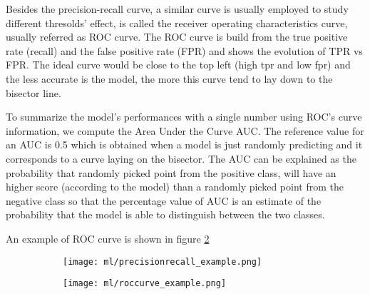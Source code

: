 \documentclass[a4paper,11pt]{article}
\begin{document}
Besides the precision-recall curve, a similar curve is usually employed to study different thresolds' effect, is called the receiver operating characteristics curve, usually referred as ROC curve.
The ROC curve is build from the true positive rate (recall) and the false positive rate (FPR) and shows the evolution of TPR vs FPR.
The ideal curve would be close to the top left (high tpr and low fpr) and the less accurate is the model, the more this curve tend to lay down to the bisector line.

To summarize the model's performances with a single number using ROC's curve information, we compute the Area Under the Curve AUC.
The reference value for an AUC is 0.5 which is obtained when a model is just randomly predicting and it corresponds to a curve laying on the bisector.
The AUC can be explained as the probability that randomly picked point from the positive class, will have an higher score (according to the model) than a randomly picked point from the negative class so that the percentage value of AUC is an estimate of the probability that the model is able to distinguish between the two classes.

An example of ROC curve is shown in figure \ref{fig:roccurve}


\begin{figure}
\centering
\begin{subfigure}{0.4\textwidth}
\texttt{[image: ml/precisionrecall\_example.png]}
\caption{}
\label{fig:precisionrecall}
\end{subfigure}
\begin{subfigure}{0.4\textwidth}
\texttt{[image: ml/roccurve\_example.png]}
\caption{}
\label{fig:roccurve}
\end{subfigure}
\caption{}
\label{}
\end{figure}
\end{document}
